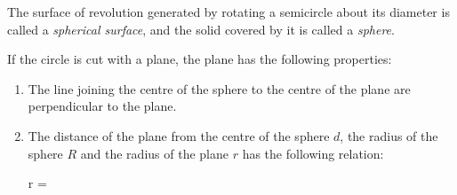 \documentclass{report}
\begin{document}
\begin{multicols}{2}
    The surface of revolution generated by rotating a semicircle about its diameter
    is called a \emph{spherical surface}, and the solid covered by it is called a
    \emph{sphere}.

    \begin{center}
    \end{center}

    If the circle is cut with a plane, the plane has the following properties:
    \begin{enumerate}
        \item The line joining the centre of the sphere to the centre of the plane are
              perpendicular to the plane.
        \item The distance of the plane from the centre of the sphere $d$, the radius of the
              sphere $R$ and the radius of the plane $r$ has the following relation:
              \begin{cequation}
                  r = 
              \end{cequation}
    \end{enumerate}

    \begin{center}
        \def\myangle{70}%
        \tdplotsetmaincoords{\myangle}{0}%
\end{center}
\end{multicols}
\end{document}
